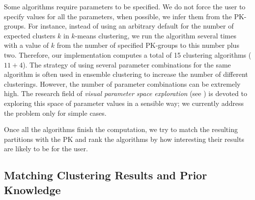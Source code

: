 \begin{revs}
Some algorithms require parameters to be specified. We do not force the user to specify values for all the parameters, when possible, we infer them from the PK-groups. For instance, instead of using an arbitrary default for the number of expected clusters $k$ in $k$-means clustering, we run the algorithm several times with a value of $k$ from the number of specified PK-groups to this number plus two. Therefore, our implementation computes a total of 15 clustering algorithms ($11+4$).
%
The strategy of using several parameter combinations for the same algorithm is often used in ensemble clustering to increase the number of different clusterings.
However, the number of parameter combinations can be extremely high. The research field of \emph{visual parameter space exploration} (see \eg \cite{6876043}) is devoted to exploring this space of parameter values in a sensible way; we currently address the problem only for simple cases.



Once all the algorithms finish the computation, we try to match the resulting partitions with the PK and rank the algorithms by how interesting their results are likely to be for the user.
\end{revs}



\subsection{Matching Clustering Results and Prior Knowledge}
\label{sec:matching}

